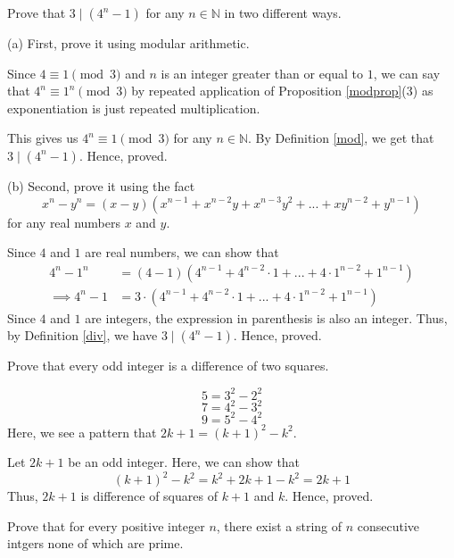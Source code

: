 \begin{problem} 
	Prove that $3 \mid (4^n - 1)$ for any $n \in \mathbb{N}$ in two different ways.

	(a) First, prove it using modular arithmetic.
	\begin{solution}
		Since $4 \equiv 1 \pmod{3}$ and $n$ is an integer greater than or equal to $1$, we can say that $4^n \equiv 1^n \pmod{3}$ by repeated application of Proposition \ref{modprop}(3) as exponentiation is just repeated multiplication.

		This gives us $4^n \equiv 1 \pmod{3}$ for any $n \in \mathbb{N}$.
		By Definition \ref{mod}, we get that $3 \mid (4^n-1)$.
		Hence, proved.
	\end{solution}
	
	(b) Second, prove it using the fact
	$$x^n - y^n = (x-y)(x^{n-1} + x^{n-2}y + x^{n-3}y^2+ ... + xy^{n-2} + y^{n-1})$$ 
	for any real numbers $x$ and $y$.
	\begin{solution}
		Since $4$ and $1$ are real numbers, we can show that 
		\begin{align}
			4^n - 1^n &= (4-1)(4^{n-1} + 4^{n-2} \cdot 1 + ... + 4 \cdot 1^{n-2} + 1^{n-1}) \\
			\implies 4^n - 1 &= 3 \cdot (4^{n-1} + 4^{n-2} \cdot 1 + ... + 4 \cdot 1^{n-2} + 1^{n-1})
		\end{align}
		Since $4$ and $1$ are integers, the expression in parenthesis is also an integer. Thus, by Definition \ref{div}, we have $3 \mid (4^n - 1)$. Hence, proved.
	\end{solution}
\end{problem}


\begin{problem}
	Prove that every odd integer is a difference of two squares.
\end{problem}

\begin{scratch}
	$$5 = 3^2 - 2^2$$
	$$7 = 4^2 - 3^2$$
	$$9 = 5^2 - 4^2$$
	Here, we see a pattern that $2k+1 = (k+1)^2 - k^2$.
\end{scratch}

\begin{solution}
	Let $2k+1$ be an odd integer. Here, we can show that
	$$(k+1)^2 - k^2 = k^2 + 2k + 1 - k^2 = 2k + 1$$
	Thus, $2k+1$ is difference of squares of $k+1$ and $k$.
	Hence, proved.
\end{solution}


\begin{problem}
	Prove that for every positive integer $n$, there exist a string of $n$ consecutive intgers none of which are prime.
\end{problem}

